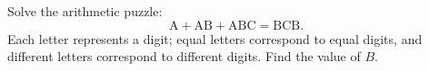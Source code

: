 Solve the arithmetic puzzle: \[\text{A}+\text{AB}+\text{ABC}=\text{BCB}.\]Each letter represents a digit; equal letters correspond to equal digits, and different letters correspond to different digits. Find the value of $B$.
